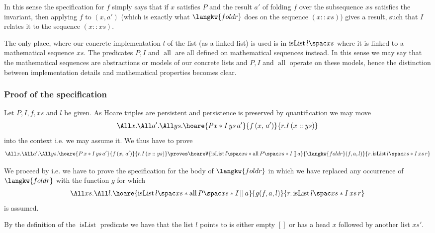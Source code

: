 In this sense the specification for $f$ simply says that if $x$ satisfies $P$ and the result $a'$ of folding $f$ over the subsequence $xs$ satisfies the invariant, then applying $f$ to $(x, a')$ (which is exactly what $\langkw{foldr}$ does on the sequence $(x::xs)$) gives a result, such that $I$ relates it to the sequence $(x::xs)$.

\begin{remark}
  The only place, where our concrete implementation $l$ of the list (as a linked list) is used is in $\isList {l} {xs}$ where it is linked to a mathematical sequence $xs$.
  The predicates $P, I$ and $\operatorname{all}$ are all defined on mathematical sequences instead.
  In this sense we may say that the mathematical sequences are abstractions or models of our concrete lists and $P, I$ and $\operatorname{all}$ operate on these models, hence the distinction between implementation details and mathematical properties becomes clear.
\end{remark}

\subsubsection*{Proof of the specification}
Let $P, I, f, xs$ and $l$ be given. As Hoare triples are persistent and persistence is preserved by quantification we may move 
\begin{align*}
\All x. \All a'. \All ys. \hoare{P x \ast I \, ys \, a'}{f \, (x, \, a')}{r. I\, (x::ys)}
 \end{align*} 
 into the context i.e. we may assume it. We thus have to prove
\begin{align*}
\All x. \All a'. \All ys. \hoare{P \, x \ast I \, ys \, a'}{f \, (x, \, a')}{r. I\, (x::ys)}
\proves \hoareV
{ \isList {l} {xs} \ast \all {P} {xs} \ast  I \, [] \, a}
{\langkw{foldr}(f, a, l)}
{r.  \isList {l} {xs} \ast I \, xs\, r}
\end{align*}

We proceed by  i.e. we have to prove the specification for the body of $\langkw{foldr}$ in which we have replaced any occurrence of $\langkw{foldr}$ with the function $g$ for which
\begin{align*}
\All xs. \All l. \hoare{ \isList {l} {xs} \ast \all {P} {xs} \ast  I \, [] \, a}
 {g(f, a, l)}
{r.  \isList {l} {xs} \ast I \, xs\, r}
\end{align*}
is assumed.

By the definition of the $\operatorname{isList}$ predicate we have that the list $l$ points to is either empty $[]$ or has a head $x$ followed by another list $xs'$.  


